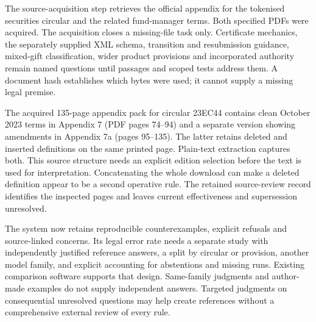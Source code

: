 The source-acquisition step retrieves the official appendix for the tokenised
securities circular and the related fund-manager terms. Both specified PDFs were acquired.
The acquisition closes a missing-file task only. Certificate mechanics, the
separately supplied XML schema, transition and resubmission guidance, mixed-gift
classification, wider product provisions and incorporated authority remain
named questions until passages and scoped tests address them. A document hash
establishes which bytes were used; it cannot supply a missing legal premise.

The acquired 135-page appendix pack for circular 23EC44 contains clean October
2023 terms in Appendix 7 (PDF pages 74--94) and a separate version showing
amendments in Appendix 7a (pages 95--135). The latter retains deleted and inserted definitions on the same
printed page. Plain-text extraction captures both. This source structure needs
an explicit edition selection before the text is used for interpretation.
Concatenating the whole download can make a deleted definition appear to be a
second operative rule. The retained source-review record identifies the inspected
pages and leaves current effectiveness and supersession unresolved.

The system now retains reproducible counterexamples, explicit refusals and
source-linked concerns. Its legal error rate needs a separate study with
independently justified reference answers, a split by circular or provision,
another model family, and explicit accounting for abstentions and missing runs.
Existing comparison software supports that design. Same-family judgments and
author-made examples do not supply independent answers. Targeted judgments on
consequential unresolved questions may help create references without a
comprehensive external review of every rule.
